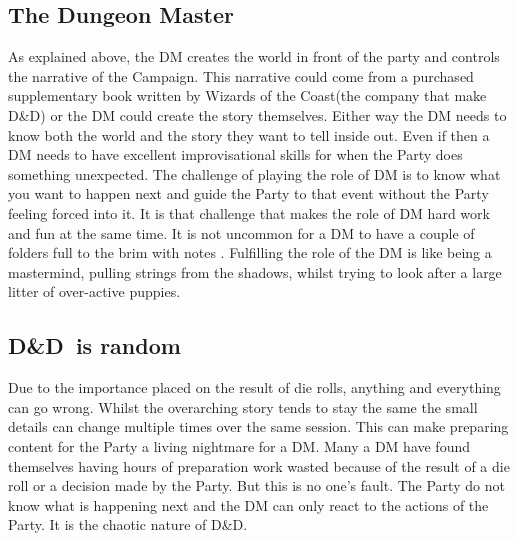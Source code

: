 \documentclass[progress]{cmpreport}
\newcommand{\WotC}{Wizards of the Coast}
\newcommand{\dnd}{D\&D}
\begin{document}
	\subsection{The Dungeon Master}
	As explained above, the DM creates the world in front of the party and controls the narrative of the Campaign. This narrative could come from a purchased supplementary book written by \WotC (the company that make \dnd) or the DM could create the story themselves. Either way the DM needs to know both the world and the story they want to tell inside out. Even if then a DM needs to have excellent improvisational skills for when the Party does something unexpected. The challenge of playing the role of DM is to know what you want to happen next and guide the Party to that event without the Party feeling forced into it. It is that challenge that makes the role of DM hard work and fun at the same time. It is not uncommon for a DM to have a couple of folders full to the brim with notes \citep{GMTips}. Fulfilling the role of the DM is like being a mastermind, pulling strings from the shadows, whilst trying to look after a large litter of over-active puppies. 

	\subsection{\dnd \ is random}
	Due to the importance placed on the result of die rolls, anything and everything can go wrong. Whilst the overarching story tends to stay the same the small details can change multiple times over the same session. This can make preparing content for the Party a living nightmare for a DM. Many a DM have found themselves having hours of preparation work wasted because of the result of a die roll or a decision made by the Party. But this is no one's fault. The Party do not know what is happening next and the DM can only react to the actions of the Party. It is the chaotic nature of \dnd. 
	
\end{document}
